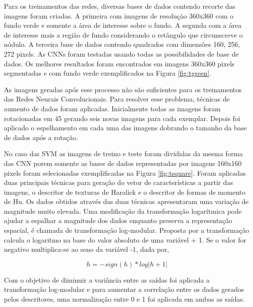 \documentclass[12pt]{article}
\begin{document}
Para os treinamentos das redes, diversas bases de dados contendo recorte das imagens foram criadas. A primeira com imagens de resolução 360x360 com o fundo verde e somente a área de interesse sobre o fundo. A segunda com a área de interesse mais a região de fundo considerando o retângulo que circunscreve o nódulo. A terceira base de dados contendo quadrados com dimensões 160, 256, 272 pixels. As CNNs foram testadas usando todas as possibilidades de base de dados. Os melhores resultados foram encontrados em imagens 360x360 pixels segmentadas e com fundo verde exemplificados na Figura \ref{fig:tgreen}.

As imagens geradas após esse processo não são suficientes para os treinamentos das Redes Neurais Convolucionais. Para resolver esse problema, técnicas de aumento de dados foram aplicadas. Inicialmente todas as imagens foram rotacionadas em 45\textdegree{} gerando seis novas imagens para cada exemplar. Depois foi aplicado o espelhamento em cada uma das imagens dobrando o tamanho da base de dados após a rotação.

No caso das SVM as imagens de treino e teste foram divididas da mesma forma das CNN porem somente as bases de dados representadas por imagens 160x160 pixels foram selecionadas exemplificadas na Figura \ref{fig:tsquare}. Foram aplicadas duas principais técnicas para geração do vetor de características a partir das imagens, o descritor de texturas de Haralick e o descritor de formas de momento de Hu. Os dados obtidos através das duas técnicas apresentaram uma variação de magnitude muito elevada. Uma modificação da transformação logarítmica pode ajudar a espalhar a magnitude dos dados enquanto preserva a representação espacial, é chamada de transformação log-modular. Proposta por \cite{JohnDraper} a transformação calcula o logaritmo na base do valor absoluto de uma variável + 1. Se o valor for negativo multiplica-se ao seno da variável -1, dada por,

\[ h=-sign(h)*log|h+1| \]

Com o objetivo de diminuir a variância entre as saídas foi aplicada a transformação log-modular e para aumentar a correlação entre os dados gerados pelos descritores, uma normalização entre 0 e 1 foi aplicada em ambas as saídas.
\end{document}
